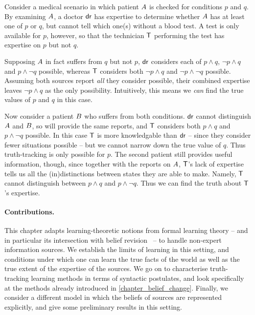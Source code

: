 \begin{example}
    \label{tt_ex_informal_example}

    Consider a medical scenario in which patient $A{}$ is checked for
    conditions $p$ and $q$. By examining $A{}$, a doctor
    $\mathsf{dr}{}$ has expertise to determine whether $A{}$ has at least one
    of $p$ or $q$, but cannot tell which one(s) without a blood test. A test is
    only available for $p$, however, so that the technician $\mathsf{T}{}$
    performing the test has expertise on $p$ but not $q$.

    Supposing $A{}$ in fact suffers from $q$ but not $p$, $\mathsf{dr}{}$
    considers each of $p \land q$, $\neg p \land q$ and $p \land \neg q$
    possible, whereas $\mathsf{T}{}$ considers both $\neg p \land q$ and $\neg p
    \land \neg q$ possible.
    Assuming both sources report \emph{all} they consider possible, their
    combined expertise leaves $\neg p \land q$ as the only
    possibility. Intuitively, this means we \emph{can} find the true values of
    $p$ and $q$ in this case.

    Now consider a patient $B{}$ who suffers from both conditions.
    $\mathsf{dr}{}$ cannot distinguish $A{}$ and $B{}$, so will provide
    the same reports, and $\mathsf{T}{}$ considers both $p \land q$ and $p \land
    \neg q$ possible. In this case $\mathsf{T}{}$ is more knowledgable than $\mathsf{dr}{}$
    -- since they consider fewer situations possible -- but we cannot narrow
    down the true value of $q$. Thus truth-tracking is only possible for $p$.
    The second patient still provides useful information, though, since
    together with the reports on $A{}$,
    $\mathsf{T}{}$'s lack of expertise tells us all the (in)distinctions between
    states they are able to make. Namely, $\mathsf{T}{}$ cannot distinguish between
    $p \land q$ and $p \land \neg q$. Thus we can find the truth about
    $\mathsf{T}{}$'s expertise.

\end{example}

\paragraph{Contributions.}

This chapter adapts learning-theoretic notions from formal learning theory --
and in particular its intersection with belief revision~\cite{baltag_tt_2019}
-- to handle non-expert information sources. We establish the limits of
learning in this setting, and conditions under which one can learn the true
facts of the world as well as the true extent of the expertise of the sources.
We go on to characterise truth-tracking learning methods in terms of syntactic
postulates, and look specifically at the methods already introduced in
\cref{chapter_belief_change}. Finally, we consider a different model in which
the beliefs of sources are represented explicitly, and give some preliminary
results in this setting.

